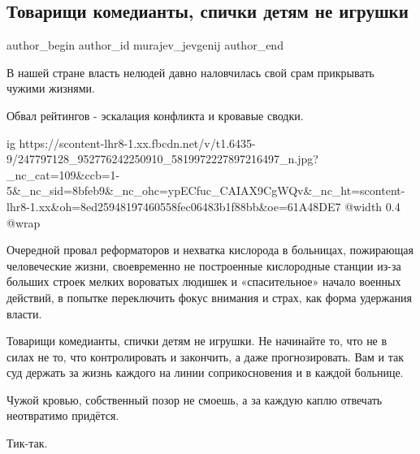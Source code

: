  
 
 
 
 
 
\subsection{Товарищи комедианты, спички детям не игрушки}
\label{sec:26_10_2021.fb.murajev_jevgenij.1.komedianty_vlast}
 
\ifcmt
 author_begin
   author_id murajev_jevgenij
 author_end
\fi

В нашей стране власть нелюдей давно наловчилась свой срам прикрывать чужими
жизнями. 

Обвал рейтингов -  эскалация конфликта и кровавые сводки. 

\ifcmt
  ig https://scontent-lhr8-1.xx.fbcdn.net/v/t1.6435-9/247797128_952776242250910_5819972227897216497_n.jpg?_nc_cat=109&ccb=1-5&_nc_sid=8bfeb9&_nc_ohc=ypECfuc_CAIAX9CgWQv&_nc_ht=scontent-lhr8-1.xx&oh=8ed25948197460558fec06483b1f88bb&oe=61A48DE7
  @width 0.4
  @wrap 
\fi

Очередной провал реформаторов и нехватка кислорода в больницах, пожирающая
человеческие жизни, своевременно не построенные кислородные станции из-за
больших строек мелких вороватых людишек и «спасительное» начало военных
действий, в попытке переключить фокус внимания и страх, как форма удержания
власти. 

Товарищи комедианты, спички детям не игрушки. Не начинайте то, что не в силах
не то, что контролировать и закончить, а даже прогнозировать. Вам и так суд
держать за жизнь каждого на линии соприкосновения и в каждой больнице. 

Чужой кровью, собственный позор не смоешь, а за каждую каплю отвечать
неотвратимо придётся.

Тик-так.
